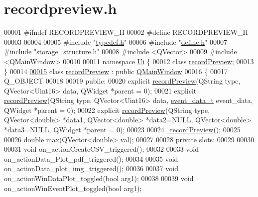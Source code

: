 \hypertarget{a00130_source}{\section{recordpreview.\+h}
\label{a00130_source}
}

\begin{DoxyCode}
00001 \textcolor{preprocessor}{#ifndef RECORDPREVIEW\_H}
00002 \textcolor{preprocessor}{#define RECORDPREVIEW\_H}
00003 
00004 
00005 \textcolor{preprocessor}{#include "\hyperlink{a00004}{typedef.h}"}
00006 \textcolor{preprocessor}{#include "\hyperlink{a00090}{define.h}"}
00007 \textcolor{preprocessor}{#include "\hyperlink{a00006}{storage\_structure.h}"}
00008 \textcolor{preprocessor}{#include <QVector>}
00009 \textcolor{preprocessor}{#include <QMainWindow>}
00010 
00011 \textcolor{keyword}{namespace }\hyperlink{a00145}{Ui} \{
00012 \textcolor{keyword}{class }\hyperlink{a00073}{recordPreview};
00013 \}
00014 
\hypertarget{a00130_source_l00015}{}\hyperlink{a00073}{00015} \textcolor{keyword}{class }\hyperlink{a00073}{recordPreview} : \textcolor{keyword}{public} \hyperlink{a00058}{QMainWindow}
00016 \{
00017     Q\_OBJECT
00018     
00019 \textcolor{keyword}{public}:
00020     \textcolor{keyword}{explicit} \hyperlink{a00073_a03ad4ae83a5594f6dc337c7b71873edd}{recordPreview}(QString type, QVector<Uint16> data, QWidget *parent = 0);
00021     \textcolor{keyword}{explicit} \hyperlink{a00073_a03ad4ae83a5594f6dc337c7b71873edd}{recordPreview}(QString type, QVector<Uint16> data, 
      \hyperlink{a00006_d6/d7d/a00161}{event\_data\_t} event\_data, QWidget *parent = 0);
00022     \textcolor{keyword}{explicit} \hyperlink{a00073_a03ad4ae83a5594f6dc337c7b71873edd}{recordPreview}(QString type, QVector<double> *data1, QVector<double> *data2=NULL, 
      QVector<double> *data3=NULL, QWidget *parent = 0);
00023 
00024     \hyperlink{a00073_ab04c69b9693e7a59a08a5faa6742b71f}{~recordPreview}();
00025 
00026     \textcolor{keywordtype}{double} \hyperlink{a00073_ad38222699419e6ac871ce2a23c6d292e}{max}(QVector<double> val);
00027 
00028 \textcolor{keyword}{private} slots:
00029 
00030 
00031     \textcolor{keywordtype}{void} on\_actionCreateCSV\_triggered();
00032 
00033     \textcolor{keywordtype}{void} on\_actionData\_Plot\_pdf\_triggered();
00034 
00035     \textcolor{keywordtype}{void} on\_actionData\_plot\_img\_triggered();
00036 
00037     \textcolor{keywordtype}{void} on\_actionWinDataPlot\_toggled(\textcolor{keywordtype}{bool} arg1);
00038 
00039     \textcolor{keywordtype}{void} on\_actionWinEventPlot\_toggled(\textcolor{keywordtype}{bool} arg1);

\end{DoxyCode}
